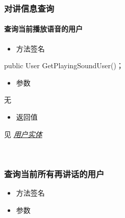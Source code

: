 \documentclass[letterpaper,10pt,english]{sphinxmanual}
\begin{document}
\subsubsection{对讲信息查询}
\label{\detokenize{csharp:id49}}

\paragraph{查询当前播放语音的用户}
\label{\detokenize{csharp:id50}}\begin{itemize}
\item {} 
方法签名

\end{itemize}

%
\begin{sphinxVerbatim}[commandchars=\\\{\}]
public User GetPlayingSoundUser()；
\end{sphinxVerbatim}
\begin{itemize}
\item {} 
参数

\end{itemize}

无
\begin{itemize}
\item {} 
返回值

\end{itemize}

见 {\hyperref[\detokenize{csharp:user}]{\emph{用户实体}}}

​


\subsubsection{查询当前所有再讲话的用户}
\label{\detokenize{csharp:id51}}\begin{itemize}
\item {} 
方法签名

\end{itemize}

%
\begin{sphinxVerbatim}[commandchars=\\\{\}]
 \PYG{p}{[}\PYG{p}{]} 
\end{sphinxVerbatim}
\begin{itemize}
\item {} 
参数

\end{itemize}
\end{document}

